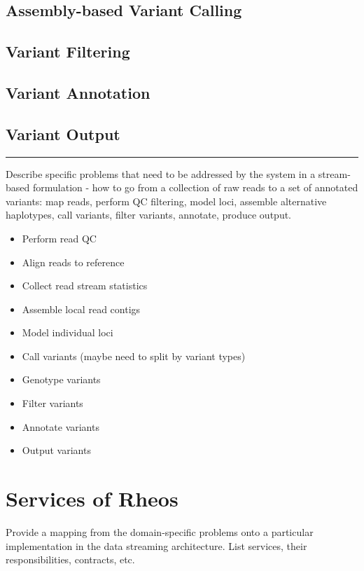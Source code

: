 \subsection{Assembly-based Variant Calling}

\subsection{Variant Filtering}

\subsection{Variant Annotation}

\subsection{Variant Output}

\hrule
Describe specific problems that need to be addressed by the system in a stream-based formulation - how to go from a collection of raw reads to a set of annotated variants: map reads, perform QC filtering, model loci, assemble alternative haplotypes, call variants, filter variants, annotate, produce output.  


\begin{itemize}
    \item Perform read QC
    \item Align reads to reference
    \item Collect read stream statistics
    \item Assemble local read contigs
    \item Model individual loci
    \item Call variants (maybe need to split by variant types)
    \item Genotype variants
    \item Filter variants
    \item Annotate variants
    \item Output variants
\end{itemize}




\section{Services of Rheos}

Provide a mapping from the domain-specific problems onto a particular implementation in the data streaming architecture. List services, their responsibilities, contracts, etc.

